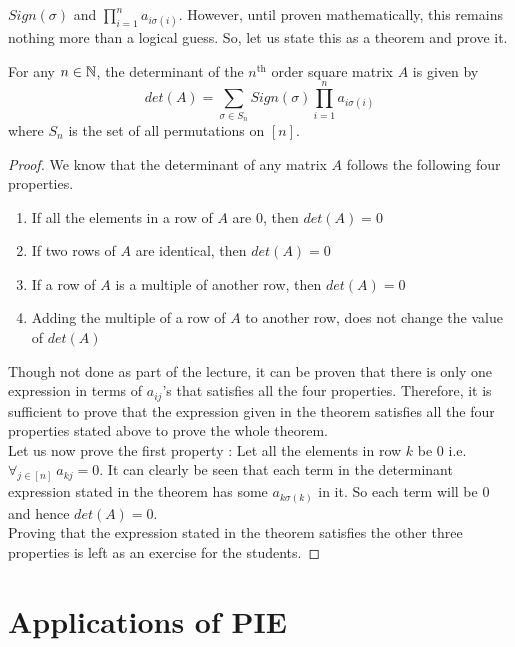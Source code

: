 $Sign(\sigma)$ and $\prod_{i=1}^{n} a_{i\sigma(i)}$. However, until proven mathematically, this remains nothing more than a logical guess. So, let us state this as a theorem and prove it.
\begin{theorem}
For any $n \in \mathbb{N}$, the determinant of the $n^{\text{th}}$ order square matrix $A$ is given by
$$det(A) = \sum_{\sigma \in S_n} Sign(\sigma)  \prod_{i=1}^{n} a_{i\sigma(i)}$$
where $S_n$ is the set of all permutations on $[n]$. 
\end{theorem}
\begin{proof}
We know that the determinant of any matrix $A$ follows the following four properties.
\begin{enumerate}
    \item If all the elements in a row of $A$ are 0, then $det(A)=0$
    \item If two rows of $A$ are identical, then $det(A)=0$
    \item If a row of $A$ is a multiple of another row, then $det(A)=0$
    \item Adding the multiple of a row of $A$ to another row, does not change the value of $det(A)$
\end{enumerate}
Though not done as part of the lecture, it can be proven that there is only one expression in terms of $a_{ij}$'s that satisfies all the four properties. Therefore, it is sufficient to prove that the expression given in the theorem satisfies all the four properties stated above to prove the whole theorem. \\
Let us now prove the first property : Let all the elements in row $k$ be 0 i.e. $\forall_{j\in[n]}~ a_{kj} = 0$. It can clearly be seen that each term in the determinant expression stated in the theorem has some $a_{k\sigma(k)}$ in it. So each term will be 0 and hence $det(A)=0$. \\
Proving that the expression stated in the theorem satisfies the other three properties is left as an exercise for the students.
\end{proof}

\section{Applications of PIE} \label{sec:Applications of PIE - lec3}
